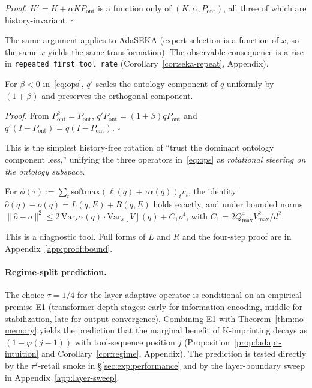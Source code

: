 \emph{Proof.} $K' = K + \alpha K P_{\mathrm{ont}}$ is a function only of $(K, \alpha, P_{\mathrm{ont}})$, all three of which are history-invariant. $\square$

The same argument applies to AdaSEKA (expert selection is a function of $x$, so the same $x$ yields the same transformation). The observable consequence is a rise in \texttt{repeated\_first\_tool\_rate} (Corollary~\ref{cor:seka-repeat}, Appendix).

\begin{theorem}\label{thm:q-sign}
For $\beta < 0$ in~\eqref{eq:ops}, $q'$ scales the ontology component of $q$ uniformly by $(1+\beta)$ and preserves the orthogonal component.
\end{theorem}

\emph{Proof.} From $P_{\mathrm{ont}}^2 = P_{\mathrm{ont}}$, $q' P_{\mathrm{ont}} = (1+\beta) q P_{\mathrm{ont}}$ and $q'(I-P_{\mathrm{ont}}) = q(I-P_{\mathrm{ont}})$. $\square$

This is the simplest history-free rotation of ``trust the dominant ontology component less,'' unifying the three operators in~\eqref{eq:ops} as \emph{rotational steering on the ontology subspace}.

\begin{theorem}\label{thm:bound}
For $\phi(\tau) := \sum_t \mathrm{softmax}(\ell(q) + \tau\alpha(q))_t v_t$, the identity $\hat o(q) - o(q) = L(q, E) + R(q, E)$ holds exactly, and under bounded norms $\|\hat o - o\|^2 \le 2\,\mathrm{Var}_s\alpha(q)\cdot \mathrm{Var}_s[V](q) + C_1\rho^4$, with $C_1 = 2 Q_{\max}^4 V_{\max}^2/d^2$.
\end{theorem}

This is a diagnostic tool. Full forms of $L$ and $R$ and the four-step proof are in Appendix~\ref{app:proof:bound}.

\paragraph{Regime-split prediction.}
The choice $\tau = 1/4$ for the layer-adaptive operator is conditional on an empirical premise E1 (transformer depth stages: early for information encoding, middle for stabilization, late for output convergence). Combining E1 with Theorem~\ref{thm:no-memory} yields the prediction that the marginal benefit of K-imprinting decays as $(1 - \varphi(j-1))$ with tool-sequence position $j$ (Proposition~\ref{prop:ladapt-intuition} and Corollary~\ref{cor:regime}, Appendix). The prediction is tested directly by the $\tau^2$-retail smoke in \S\ref{sec:exp:performance} and by the layer-boundary sweep in Appendix~\ref{app:layer-sweep}.
